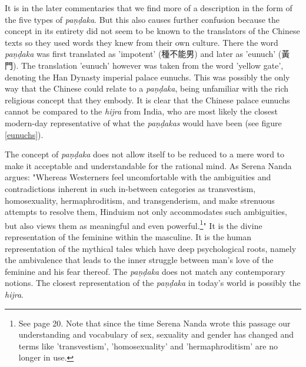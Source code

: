 It is in the later commentaries that we find more of a description in the form of the five types of {\em paṇḍaka}. But this also causes further confusion because the concept in its entirety did not seem to be known to the translators of the Chinese texts so they used words they knew from their own culture. There the word {\em paṇḍaka} was first translated as 'impotent' (種不能男) and later as 'eunuch' (黃門). The translation 'eunuch' however was taken from the word 'yellow gate', denoting the Han Dynasty imperial palace eunuchs. This was possibly the only way that the Chinese could relate to a {\em paṇḍaka}, being unfamiliar with the rich religious concept that they embody. It is clear that the Chinese palace eunuchs cannot be compared to the {\em hijra} from India, who are most likely the closest modern-day representative of what the {\em paṇḍakas} would have been (see figure \ref{eunuchs}).

The concept of {\em paṇḍaka} does not allow itself to be reduced to a mere word to make it acceptable and understandable for the rational mind. As Serena Nanda argues: "Whereas Westerners feel uncomfortable with the ambiguities and contradictions inherent in such in-between categories as transvestism, homosexuality, hermaphroditism, and transgenderism, and make strenuous attempts to resolve them, Hinduism not only accommodates such ambiguities, but also views them as meaningful and even powerful.\footnote{See \cite{nanda} page 20. Note that since the time Serena Nanda wrote this passage our understanding and vocabulary of sex, sexuality and gender has changed and terms like 'transvestism', 'homosexuality' and 'hermaphroditism' are no longer in use.}" It is the divine representation of the feminine within the masculine. It is the human representation of the mythical tales which have deep psychological roots, namely the ambivalence that leads to the inner struggle between man's love of the feminine and his fear thereof. The {\em paṇḍaka} does not match any contemporary notions. The closest representation of the {\em paṇḍaka} in today's world is possibly the {\em hijra}.
